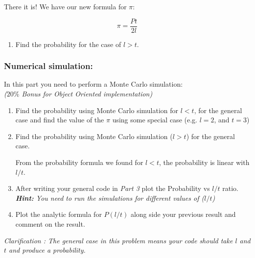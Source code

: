 \documentclass[12pt,letterpaper]{article}
\begin{document}
There it is! We have our new formula for $\pi$:

\begin{equation*}
\pi = \frac{Pt}{2l}
\end{equation*}

\begin{enumerate}
\item Find the probability for the case of $l>t$.
\end{enumerate}

\subsubsection*{Numerical simulation:} 
In this part you need to perform a Monte Carlo simulation: \\
\textit{($20\%$ Bonus for Object Oriented implementation)}

\begin{enumerate}[resume]
\item {Find the probability using Monte Carlo simulation for $l<t$, for the general case and find the value of the $\pi$ using some special case (e.g. $l = 2$, and $t = 3$)}  

\item Find the probability using Monte Carlo simulation ($l>t$) for the general case. 


From the probability formula we found for $l<t$, the probability is linear with $l/t$.

\item After writing your general code in \textit{Part 3} plot the Probability vs $l/t$ ratio. \\ 
\textit{\textbf{Hint:} You need to run the simulations for different values of ($l/t$)}


\item Plot the analytic formula for $P(l/t)$ along side your previous result and comment on the result. 
\end{enumerate}

\textit{Clarification : The general case  in this problem means your code should take $l$ and $t$ and produce a probability.}
\end{document}

